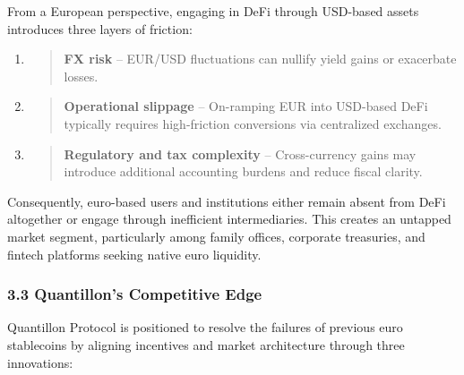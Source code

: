 From a European perspective, engaging in DeFi through USD-based assets
introduces three layers of friction:

\begin{enumerate}
\def\labelenumi{\arabic{enumi}.}
\item
  \begin{quote}
  \textbf{FX risk} -- EUR/USD fluctuations can nullify yield gains or
  exacerbate losses.
  \end{quote}
\item
  \begin{quote}
  \textbf{Operational slippage} -- On-ramping EUR into USD-based DeFi
  typically requires high-friction conversions via centralized
  exchanges.
  \end{quote}
\item
  \begin{quote}
  \textbf{Regulatory and tax complexity} -- Cross-currency gains may
  introduce additional accounting burdens and reduce fiscal clarity.
  \end{quote}
\end{enumerate}

Consequently, euro-based users and institutions either remain absent
from DeFi altogether or engage through inefficient intermediaries. This
creates an untapped market segment, particularly among family offices,
corporate treasuries, and fintech platforms seeking native euro
liquidity.

\hypertarget{quantillons-competitive-edge}{%
\subsubsection{3.3 Quantillon's Competitive
Edge}\label{quantillons-competitive-edge}}

Quantillon Protocol is positioned to resolve the failures of previous
euro stablecoins by aligning incentives and market architecture through
three innovations:


